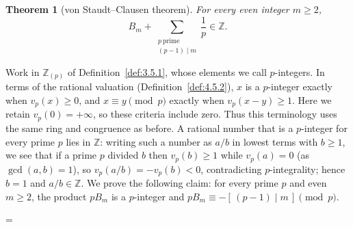 \documentclass[11pt]{article}
\makeatletter
\let\nt@closedisplay\]
\def\nt@guardedclose{\@ifnextchar\par{\nt@closeafterpar}{\@ifnextchar\end{\postdisplaypenalty\@M\nt@closedisplay}{\nt@closedisplay}}}
\def\nt@closeafterpar\par{\@ifnextchar\par{\nt@closeafterpar}{\@ifnextchar\end{\postdisplaypenalty\@M\nt@closedisplay\par}{\nt@closedisplay\par}}}
\renewenvironment{proof}[1][\proofname]{\par
  \pushQED{\qed}\normalfont\topsep\medskipamount\edef\nt@afterproof{\@endparpenalty=\the\@endparpenalty\relax}\@beginparpenalty\@M\@endparpenalty\@M\let\]\nt@guardedclose\trivlist\item[]\textit{#1\@addpunct{.}} \ignorespaces}{\ifvmode\addpenalty\@M\fi\popQED\nt@afterproof\endtrivlist\@endpefalse}
\theoremstyle{ntstyle}
\newtheorem{theorem}{Theorem}[subsection]
\makeatother
\begin{document}
\begin{theorem}[von Staudt--Clausen theorem]\label{thm:6.8.4}\label{thm:von-staudt-clausen-theorem}
  For every even integer $m \ge 2$,
  \[
    B_m + \sum_{\substack{p \ \mathrm{prime} \\ (p-1) \mid m}} \frac{1}{p} \in \mathbb{Z}.
  \]

\end{theorem}

\begin{proof} Work in $\mathbb{Z}_{(p)}$ of Definition~\ref{def:3.5.1},
  whose elements we call $p$-integers. In terms of the rational valuation
  (Definition~\ref{def:4.5.2}), $x$ is a $p$-integer exactly when
  $v_p(x)\ge0$, and $x\equiv y\pmod{p}$ exactly when $v_p(x-y)\ge1$.
  Here we retain $v_p(0)=+\infty$, so these criteria include zero.
  Thus this terminology uses the same ring and congruence as before. A rational number that is a $p$-integer for
  every prime $p$ lies in $\mathbb{Z}$: writing such a number as $a/b$ in lowest terms with $b \ge 1$, we see that
  if a prime $p$ divided $b$ then $v_p(b) \ge 1$ while $v_p(a) = 0$ (as $\gcd(a, b) = 1$), so
  $v_p(a/b) = -v_p(b) < 0$, contradicting $p$-integrality; hence $b = 1$ and $a/b \in \mathbb{Z}$. We prove the
  following claim: for every prime $p$ and even $m \ge 2$, the product $p B_m$ is a $p$-integer and
  $p B_m \equiv -[\,(p-1) \mid m\,] \pmod{p}$.


\end{proof}
\end{document}
